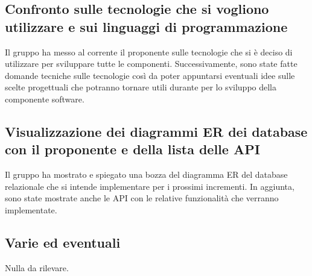 	\subsection*{Confronto sulle tecnologie che si vogliono utilizzare e sui linguaggi di programmazione}
		Il gruppo ha messo al corrente il proponente sulle tecnologie che si è deciso di utilizzare per sviluppare tutte le componenti. Successivamente, sono state fatte domande tecniche sulle tecnologie così da poter appuntarsi eventuali idee sulle scelte progettuali che potranno tornare utili durante per lo sviluppo della componente software.

	\subsection*{Visualizzazione dei diagrammi ER dei database con il proponente e della lista delle API}
		Il gruppo ha mostrato e spiegato una bozza del diagramma ER del database relazionale che si intende implementare per i prossimi incrementi. In aggiunta, sono state mostrate anche le API con le relative funzionalità che verranno implementate.

	\subsection*{Varie ed eventuali}
		Nulla da rilevare.